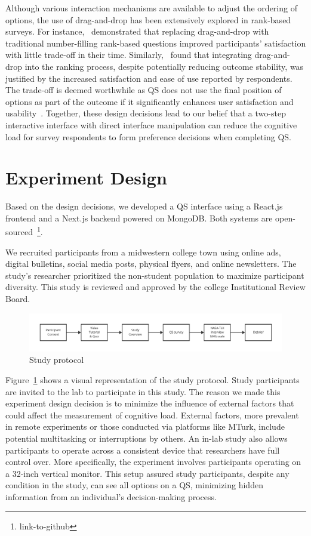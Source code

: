 Although various interaction mechanisms are available to adjust the ordering of options, the use of drag-and-drop has been extensively explored in rank-based surveys. For instance,~\textcite{krosnick2018measurement} demonstrated that replacing drag-and-drop with traditional number-filling rank-based questions improved participants' satisfaction with little trade-off in their time. Similarly,~\textcite{timbrook2013comparison} found that integrating drag-and-drop into the ranking process, despite potentially reducing outcome stability, was justified by the increased satisfaction and ease of use reported by respondents. The trade-off is deemed worthwhile as QS does not use the final position of options as part of the outcome if it significantly enhances user satisfaction and usability~\cite{rintoulVisualAnimatedResponse}.
Together, these design decisions lead to our belief that a two-step interactive interface with direct interface manipulation can reduce the cognitive load for survey respondents to form preference decisions when completing QS.

\section{Experiment Design}
\label{sec:experiment}
Based on the design decisions, we developed a QS interface using a React.js frontend and a Next.js backend powered on MongoDB. Both systems are open-sourced~\footnote{link-to-github}.

We recruited participants from a midwestern college town using online ads, digital bulletins, social media posts, physical flyers, and online newsletters. The study's researcher prioritized the non-student population to maximize participant diversity. This study is reviewed and approved by the college Institutional Review Board.

\begin{figure}[h]
    \centering
    \includegraphics[width=1\textwidth]{content/image/study_flow.pdf}
    \caption{Study protocol}
    \label{fig:studyProtocol}
\end{figure}

Figure~\ref{fig:studyProtocol} shows a visual representation of the study protocol. Study participants are invited to the lab to participate in this study. The reason we made this experiment design decision is to minimize the influence of external factors that could affect the measurement of cognitive load. External factors, more prevalent in remote experiments or those conducted via platforms like MTurk, include potential multitasking or interruptions by others. An in-lab study also allows participants to operate across a consistent device that researchers have full control over. More specifically, the experiment involves participants operating on a 32-inch vertical monitor. This setup assured study participants, despite any condition in the study, can see all options on a QS, minimizing hidden information from an individual's decision-making process.

